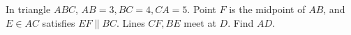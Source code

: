 In triangle $ABC$, $AB=3,BC=4,CA=5$. Point $F$ is the midpoint of $AB$, and $E\in AC$ satisfies $EF\parallel BC$. Lines $CF,BE$ meet at $D$. Find $AD$.
